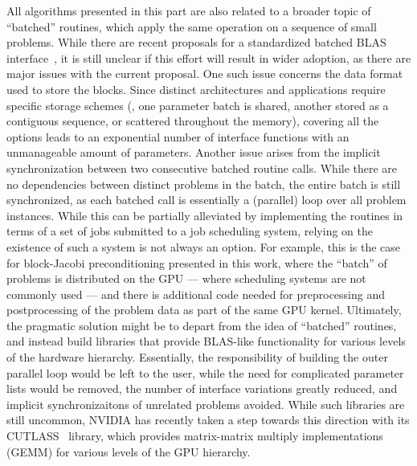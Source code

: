All algorithms presented in this part are also related to a broader topic of
``batched'' routines, which apply the same operation on a sequence of small
problems. While there are recent proposals for a standardized batched BLAS
interface~\cite{batched-blas}, it is still unclear if this effort will result in
wider adoption, as there are major issues with the current proposal. One such
issue concerns the data format used to store the blocks. Since distinct
architectures and applications require specific storage schemes (\eg, one
parameter batch is shared, another stored as a contiguous sequence, or scattered
throughout the memory), covering all the options leads to an exponential number
of interface functions with an unmanageable amount of parameters. Another issue
arises from the implicit synchronization between two consecutive batched routine
calls. While there are no dependencies between distinct problems in the batch,
the entire batch is still synchronized, as each batched call is essentially a
(parallel) loop over all problem instances. While this can be partially
alleviated by implementing the routines in terms of a set of jobs submitted to a
job scheduling system, relying on the existence of such a system is not always
an option. For example, this is the case for block-Jacobi preconditioning
presented in this work, where the ``batch'' of problems is distributed on the
GPU --- where scheduling systems are not commonly used --- and there is
additional code needed for preprocessing and postprocessing of the problem data
as part of the same GPU kernel. Ultimately, the pragmatic solution might be to
depart from the idea of ``batched'' routines, and instead build libraries that
provide BLAS-like functionality for various levels of the hardware hierarchy.
Essentially, the responsibility of building the outer parallel loop would be
left to the user, while the need for complicated parameter lists would be
removed, the number of interface variations greatly reduced, and implicit
synchronizaitons of unrelated problems avoided. While such libraries are still
uncommon, NVIDIA has recently taken a step towards this direction with its
CUTLASS~\cite{cutlass} library, which provides matrix-matrix multiply
implementations (GEMM) for various levels of the GPU hierarchy.
